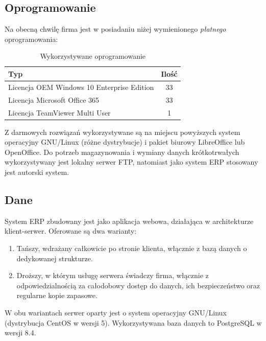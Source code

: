 \documentclass{article}
\begin{document}
        \subsection{Oprogramowanie}
            Na obecną chwilę firma jest w posiadaniu niżej wymienionego \textit{płatnego} oprogramowania:
            \begin{table}[H]
                \centering
                \begin{tabular}{ | l | c | }
                    \hline
                    \textbf{Typ} & \textbf{Ilość} \\
                    \hline
                    Licencja OEM Windows 10 Enterprise Edition & 33 \\
                    \hline
                    Licencja Microsoft Office 365 & 33 \\
                    \hline
                    Licencja TeamViewer Multi User & 1 \\
                    \hline
                \end{tabular}
                \caption{Wykorzystywane oprogramowanie}
            \end{table}

            Z darmowych rozwiązań wykorzystywane są na miejscu powyższych system operacyjny GNU/Linux (różne dystrybucje) i pakiet biurowy LibreOffice lub OpenOffice.
            Do potrzeb magazynowania i wymiany danych krótkotrwałych wykorzystywany jest lokalny serwer FTP, natomiast jako system ERP stosowany jest autorski system.
        \subsection{Dane}
            System ERP zbudowany jest jako aplikacja webowa, działająca w architekturze klient-serwer.
            Oferowane są dwa warianty:
            \begin{enumerate}
                \item Tańszy, wdrażany całkowicie po stronie klienta, włącznie z bazą danych o dedykowanej strukturze.
                \item Droższy, w którym usługę serwera świadczy firma, włącznie z odpowiedzialnością za całodobowy dostęp do danych, ich bezpieczeństwo oraz regularne kopie zapasowe.
            \end{enumerate}
            W obu wariantach serwer oparty jest o system operacyjny GNU/Linux (dystrybucja CentOS w wersji 5).
            Wykorzystywana baza danych to PostgreSQL w wersji 8.4.
\end{document}
